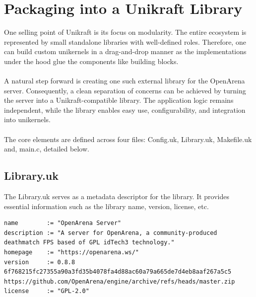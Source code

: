 \section{Packaging into a Unikraft Library}
One selling point of Unikraft is its focus on modularity. The entire ecosystem is represented by small standalone libraries with
well-defined roles. Therefore, one can build custom unikernels in a drag-and-drop manner as the implementations under the hood
glue the components like building blocks. \\ \\
A natural step forward is creating one such external library for the OpenArena server. Consequently, a clean separation of concerns can be achieved
by turning the server into a Unikraft-compatible library. The application logic remains independent, while
the library enables easy use, configurability, and integration into unikernels. \\ \\
The core elements are defined across four files: Config.uk, Library.uk, Makefile.uk and, main.c, detailed below.
\subsection{Library.uk}
The Library.uk serves as a metadata descriptor for the library.
It provides essential information such as the library name, version, license, etc.
\\
\lstset{basicstyle=\small\ttfamily, caption=Library.uk, language=C, showstringspaces=false, keepspaces=true}
\begin{lstlisting}
name        := "OpenArena Server"
description := "A server for OpenArena, a community-produced deathmatch FPS based of GPL idTech3 technology."
homepage    := "https://openarena.ws/"
version     := 0.8.8 6f768215fc27355a90a3fd35b4078fa4d88ac60a79a665de7d4eb8aaf267a5c5 https://github.com/OpenArena/engine/archive/refs/heads/master.zip
license     := "GPL-2.0"
\end{lstlisting}
\\
